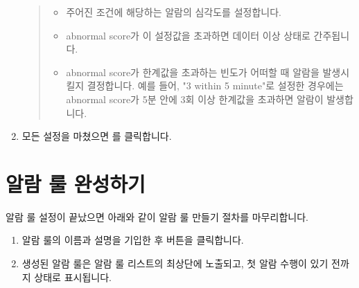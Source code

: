 \documentclass[letterpaper,10pt,english]{sphinxmanual}
\begin{document}
\begin{enumerate}
\begin{quote}
\begin{figure}[H]
\centering

\noindent{}
\end{figure}
\begin{itemize}
\item {} 
 주어진 조건에 해당하는 알람의 심각도를 설정합니다.

\item {} 
 abnormal score가 이 설정값을 초과하면 데이터 이상 상태로 간주됩니다.

\item {} 
 abnormal score가 한계값을 초과하는 빈도가 어떠할 때 알람을 발생시킬지 결정합니다. 예를 들어, "3 within 5 minute"로 설정한 경우에는 abnormal score가 5분 안에 3회 이상 한계값을 초과하면 알람이 발생합니다.

\end{itemize}
\end{quote}

\item {} 
모든 설정을 마쳤으면 를 클릭합니다.

\end{enumerate}


\section{알람 룰 완성하기}
\label{\detokenize{anomaly/part02/index:complete-rule}}\label{\detokenize{anomaly/part02/index:id7}}
알람 룰 설정이 끝났으면 아래와 같이 알람 룰 만들기 절차를 마무리합니다.
\begin{enumerate}
\def\theenumi{\arabic{enumi}}
\def\labelenumi{\theenumi .}
\makeatletter\def\p@enumii{\p@enumi \theenumi .}\makeatother
\item {} 
알람 룰의 이름과 설명을 기입한 후  버튼을 클릭합니다.
\begin{quote}

\begin{figure}[H]
\centering

\noindent{}
\end{figure}
\end{quote}

\item {} 
생성된 알람 룰은 알람 룰 리스트의 최상단에 노출되고, 첫 알람 수행이 있기 전까지  상태로 표시됩니다.
\begin{quote}

\begin{figure}[H]
\centering

\noindent{}
\end{figure}
\end{quote}

\end{enumerate}
\end{document}
